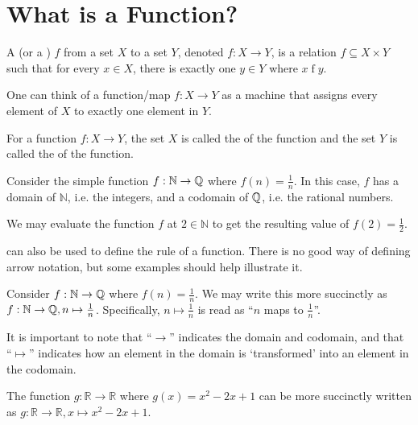 \section{What is a Function?}
\begin{definition}
    A  (or a ) $f$ from a set $X$ to a set $Y$, denoted $f: X \to Y$,  is a relation $f \subseteq X \times Y$ such that for every $x \in X$, there is exactly one $y \in Y$ where $x\mathrel{f}y$.
\end{definition}
\begin{remark}
    One can think of a function/map $f:X\to Y$ as a machine that assigns every element of $X$ to exactly one element in $Y$.
\end{remark}

\begin{definition}
    For a function $f: X \to Y$, the set $X$ is called the  of the function and the set $Y$ is called the  of the function.
\end{definition}

\begin{example}
    Consider the simple function $f: \mathbb{N} \to \mathbb{Q}$ where $f(n) = \frac1n$. In this case, $f$ has a domain of $\mathbb{N}$, i.e. the integers, and a codomain of $\mathbb{Q}$, i.e. the rational numbers.

    We may evaluate the function $f$ at $2 \in \mathbb{N}$ to get the resulting value of $f(2) = \frac12$.
\end{example}

 can also be used to define the rule of a function. There is no good way of defining arrow notation, but some examples should help illustrate it.

\begin{example}
    Consider $f: \mathbb{N} \to \mathbb{Q}$ where $f(n) = \frac1n$. We may write this more succinctly as $f: \mathbb{N} \to \mathbb{Q}, n \mapsto \frac1n$. Specifically, $n \mapsto \frac1n$ is read as ``$n$ maps to $\frac1n$''.

    It is important to note that ``$\to$'' indicates the domain and codomain, and that ``$\mapsto$'' indicates how an element in the domain is `transformed' into an element in the codomain.
\end{example}

\begin{example}
    The function $g: \mathbb{R} \to \mathbb{R}$ where $g(x) = x^2 - 2x + 1$ can be more succinctly written as $g: \mathbb{R} \to \mathbb{R}, x \mapsto x^2 - 2x + 1$.
\end{example}

